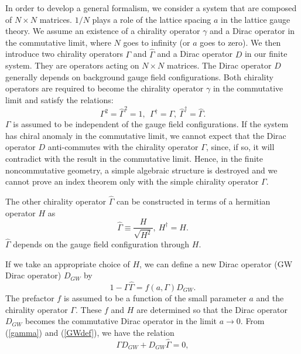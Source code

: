 \documentclass[a4paper,prl,showpacs,twocolumn]{revtex4}
\begin{document}
In order to develop a general formalism, we 
consider a system that are composed
of $N \times N$ matrices. $1/N$ plays a role of the lattice
spacing $a$ in the lattice gauge theory.
We assume an existence of a chirality
operator  $\gamma$  and a Dirac operator in the commutative limit,
where $N$ goes to infinity (or $a$ goes to zero). 
We then  introduce two chirality operators $\Gamma$
and $\hat{\Gamma}$ and a Dirac operator $D$ in our finite system.
They are operators acting on $N \times N$ matrices. 
The Dirac operator $D$ generally depends on background gauge 
field configurations. Both chirality operators 
are required to become the chirality operator $\gamma$
in the commutative limit and satisfy the relations:
\begin{equation}
\Gamma^2=\hat{\Gamma}^2=1, \ \ \Gamma^{\dagger}=\Gamma, \ 
\hat{\Gamma}^{\dagger} = \hat{\Gamma}.
\label{gamma}
\end{equation}
$\Gamma$ is assumed to be 
independent of the gauge field configurations.
If the system has chiral anomaly in the commutative limit,
we cannot expect that the Dirac operator $D$
anti-commutes with the chirality operator $\Gamma$,
since, if so, it will contradict with the result in the commutative limit.
Hence, in the finite noncommutative geometry, a simple 
algebraic structure is destroyed and we cannot prove an index 
theorem only with the simple chirality operator $\Gamma$.
\par
The other chirality operator $\hat{\Gamma}$ can be constructed in terms of
a hermitian operator $H$ as 
\begin{equation}
\hat{\Gamma} \equiv \frac{H}{\sqrt{H^2}}, \ H^{\dagger}=H.
\label{hatgamma}
\end{equation}
$\hat\Gamma$ depends on the gauge field configuration 
through $H$.
\par
If we take an appropriate choice of $H$, we can define a new
Dirac operator (GW Dirac operator) $D_{GW}$ by
\begin{equation}
1- \Gamma \hat{\Gamma} = f(a,\Gamma) D_{GW}.
\label{GWdef}
\end{equation}
The prefactor $f$ is assumed to be a function of 
the small parameter $a$ and the chirality operator $\Gamma$. 
These $f$ and $H$ are determined so that the Dirac operator 
$D_{GW}$ becomes the commutative Dirac 
operator in the limit $a \rightarrow 0$.
From (\ref{gamma}) and (\ref{GWdef}), we have the relation
\begin{equation}
\Gamma D_{GW}+D_{GW} \hat{\Gamma}=0,
\label{GWnew}
\end{equation}
\end{document}

